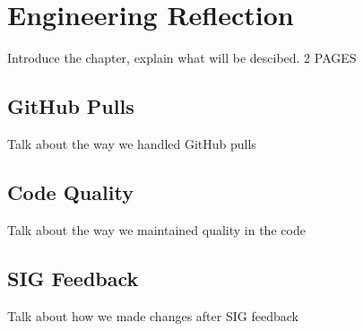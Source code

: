 \chapter{Engineering Reflection} %

Introduce the chapter, explain what will be descibed. 2 PAGES

\section{GitHub Pulls}
Talk about the way we handled GitHub pulls

\section{Code Quality}
Talk about the way we maintained quality in the code

\section{SIG Feedback}
Talk about how we made changes after SIG feedback 